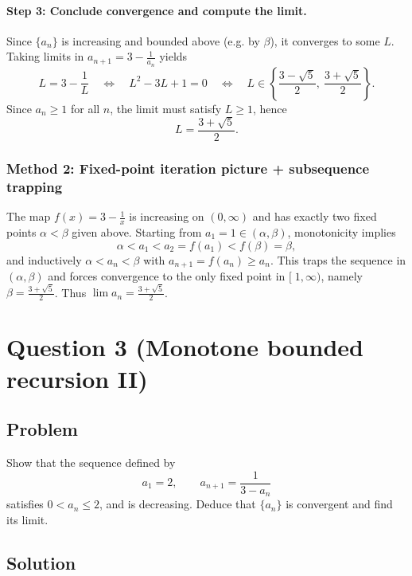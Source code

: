 \documentclass[12pt]{article}
\begin{document}
\paragraph{Step 3: Conclude convergence and compute the limit.}
Since \(\{a_n\}\) is increasing and bounded above (e.g. by \(\beta\)), it converges to some \(L\). Taking limits in \(a_{n+1}=3-\frac{1}{a_n}\) yields
\[
L = 3-\frac{1}{L}
\quad\Longleftrightarrow\quad
L^2-3L+1=0
\quad\Longleftrightarrow\quad
L\in\left\{\frac{3-\sqrt{5}}{2},\ \frac{3+\sqrt{5}}{2}\right\}.
\]
Since \(a_n\ge 1\) for all \(n\), the limit must satisfy \(L\ge 1\), hence
\[
\boxed{L=\frac{3+\sqrt{5}}{2}.}
\]

\subsubsection*{Method 2: Fixed-point iteration picture + subsequence trapping}

The map \(f(x)=3-\frac{1}{x}\) is increasing on \((0,\infty)\) and has exactly two fixed points \(\alpha<\beta\) given above. Starting from \(a_1=1\in(\alpha,\beta)\), monotonicity implies
\[
\alpha < a_1 < a_2=f(a_1) < f(\beta)=\beta,
\]
and inductively \(\alpha<a_n<\beta\) with \(a_{n+1}=f(a_n)\ge a_n\). This traps the sequence in \((\alpha,\beta)\) and forces convergence to the only fixed point in \([\;1,\infty)\), namely \(\beta=\frac{3+\sqrt{5}}{2}\). Thus \(\boxed{\lim a_n=\frac{3+\sqrt{5}}{2}}\).

\newpage


\section*{Question 3 (Monotone bounded recursion II)}

\subsection*{Problem}
Show that the sequence defined by
\[
a_1 = 2,\qquad a_{n+1} = \frac{1}{3-a_n}
\]
satisfies \(0<a_n\le 2\), and is decreasing. Deduce that \(\{a_n\}\) is convergent and find its limit.

\subsection*{Solution}
\end{document}
